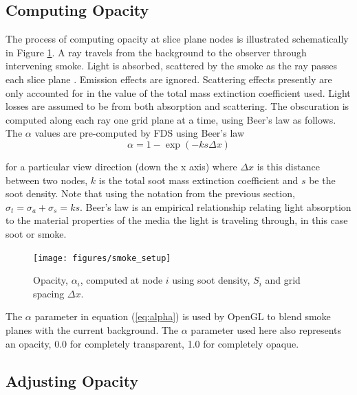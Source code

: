 %
%

\subsection{Computing Opacity}
The process of computing opacity at slice plane nodes is
illustrated schematically in Figure \ref{figsmokesetup}. A ray
travels from the background to the observer through intervening
smoke. Light is absorbed,
scattered by the smoke as the ray passes each slice plane .  Emission effects are ignored.
Scattering effects presently are only accounted for in the value
of the total mass extinction coefficient used.  Light losses are
assumed to be from both absorption and scattering. The obscuration
is computed along each ray one grid plane at a time, using Beer's
law as follows.  The $\alpha$ values are pre-computed by FDS using
Beer's law~\cite{Siegel:2001}
\begin{equation}
\alpha=1-\exp(-ks\Delta x) \label{eq:alpha}
\end{equation}

\noindent for a particular view direction (down the x axis) where
$\Delta x$ is this distance between two nodes, $k$ is the total
soot mass extinction coefficient and $s$ be the soot density.
Note that using the notation from the previous section, $\sigma_t=\sigma_a+\sigma_s=ks$.  Beer's law is an empirical relationship relating light absorption
to the material properties of the media the light is traveling
through, in this case soot or smoke.

\begin{figure}[\figoptions]
\begin{center}
\texttt{[image: figures/smoke\_setup]}
\end{center}
\caption {Opacity, $\alpha_i$, computed at node $i$ using soot density, $S_i$ and grid spacing $\Delta x$.}
\label{figsmokesetup}
\end{figure}


The $\alpha$ parameter in equation (\ref{eq:alpha}) is used by
OpenGL to blend smoke planes with the current background.  The
$\alpha$ parameter used here also represents an opacity, 0.0 for
completely transparent, 1.0 for completely opaque.

%
%

\subsection{Adjusting Opacity}

